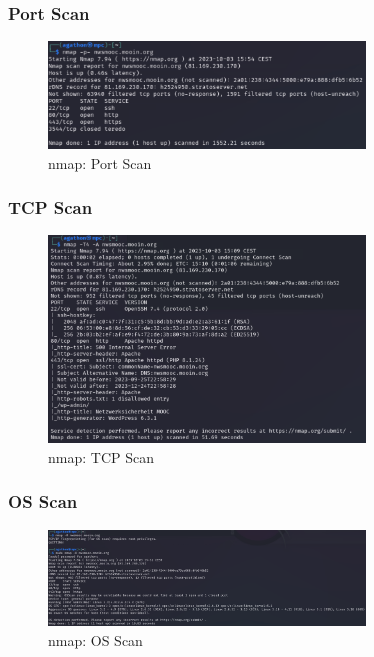 \documentclass{article}
\begin{document}
\subsubsection*{Port Scan}

\begin{figure}[H]
	\includegraphics[width=0.75\textwidth]{images/04}
	\centering
	\caption{nmap: Port Scan}
\end{figure}

\subsubsection*{TCP Scan}

\begin{figure}[H]
	\includegraphics[width=0.75\textwidth]{images/05}
	\centering
	\caption{nmap: TCP Scan}
\end{figure}

\subsubsection*{OS Scan}

\begin{figure}[H]
	\includegraphics[width=0.75\textwidth]{images/06}
	\centering
	\caption{nmap: OS Scan}
\end{figure}
\end{document}

